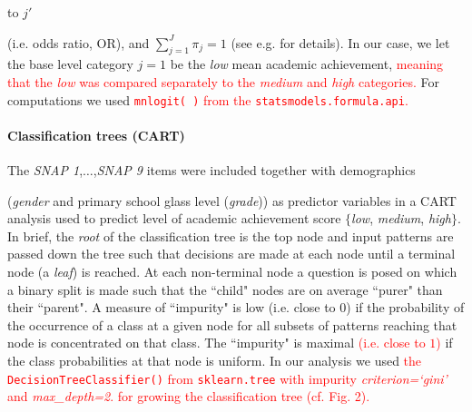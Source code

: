 \documentclass[10pt,letterpaper]{article}
\begin{document}
to $j'$ {(i.e. odds ratio, OR), and $\sum_{j=1}^J \pi_j = 1$ (see e.g. \cite{Bilder2015} for details).
In our case, we let the base level category $j=1$ be the {\it low} mean academic achievement, \textcolor{red}{meaning that the {\it low} was compared separately to 
the {\it medium} and {\it high} categories.}
For computations we used  \textcolor{red}{{\tt \small mnlogit( )} from the {\tt \small statsmodels.formula.api}.} \\




\vspace{3mm}

\paragraph{Classification trees (CART)}
The {\it SNAP 1},$\ldots$,{\it SNAP 9} items were included together with demographics {(\emph{gender} and primary school glass level ({\it grade})) as predictor variables in a CART analysis \cite{Breiman2001} used to predict level of academic achievement score $\{$\emph{low}, \emph{medium}, \emph{high}$\}$.
In brief, the \emph{root} of the classification tree is the top node and input patterns are passed down the tree such that decisions are made at each node until a terminal 
node (a \emph{leaf}) is reached. At each non-terminal node a question is posed on which a binary split is made such that the ``child" nodes are on average ``purer" than their ``parent". 
A measure of ``impurity" is 
low (i.e. close to $0$) if the probability of the occurrence of a class at a given node for all subsets of patterns reaching that node is concentrated on that class. 
The ``impurity" is maximal \textcolor{red}{(i.e. close to $1$)} if the class probabilities at that node is uniform. 
In our analysis we used \textcolor{red}{the {\tt \small DecisionTreeClassifier()}  from {\tt \small sklearn.tree} with impurity {\it criterion=`gini'} and {\it max\_depth=2}.
for growing the classification tree (cf. Fig. 2).}

}}
\end{document}
